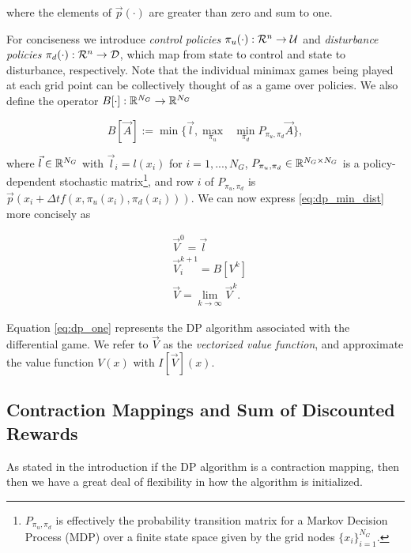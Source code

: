 \noindent where the elements of $\vec{p}(\cdot)$ are greater than zero and sum to one. 

For conciseness we introduce \emph{control policies} $\pi_u(\cdot): \mathcal{R}^n \rightarrow \mathcal{U}$ and \emph{disturbance policies} $\pi_d(\cdot): \mathcal{R}^n \rightarrow \mathcal{D}$, which map from state to control and state to disturbance, respectively. Note that the individual minimax games being played at each grid point can be collectively thought of as a game over policies. We also define the operator $B[\cdot]: \mathbb{R}^{N_G} \rightarrow \mathbb{R}^{N_G}$

\begin{equation} \label{eq: op_min_dist}
 B[\vec{A}] := \min\{\vec{l},  \underset{\pi_u}{\max}\text{ }\underset{ \pi_d}{\min} P_{\pi_u, \pi_d} \vec{A}\},
\end{equation}

\noindent where $\vec{l} \in \mathbb{R}^{N_G}$ with $\vec{l}_i = l(x_i)$ for $i=1, ..., N_G$, $P_{\pi_u, \pi_d} \in \mathbb{R}^{N_G \times N_G}$ is a policy-dependent stochastic matrix\footnote{$P_{\pi_u, \pi_d}$ is effectively the probability transition matrix for a Markov Decision Process (MDP) over a finite state space given by the grid nodes $\{x_i\}_{i=1}^{N_G}$.}, and row $i$ of $P_{\pi_u, \pi_d}$ is $\vec{p}(x_i+\Delta tf(x, \pi_u(x_i), \pi_d(x_i)))$. We can now express \eqref{eq:dp_min_dist} more concisely as

\begin{subequations}\label{eq:dp_one}
\begin{align}
&\vec{V}^{0} = \vec{l}\\
&\vec{V}_{i}^{k+1} = B[V^k] \\
&\vec{V} = \lim_{k\rightarrow \infty} \vec{V}^{k}.
\end{align}
\end{subequations}

Equation \eqref{eq:dp_one} represents the DP algorithm associated with the differential game. We refer to $\vec{V}$ as the \emph{vectorized value function}, and approximate the value function $V(x)$ with $I[\vec{V}](x)$. 

\subsection{Contraction Mappings and Sum of Discounted Rewards}

As stated in the introduction if the DP algorithm is a contraction mapping, then then we have a great deal of flexibility in how the algorithm is initialized.  

